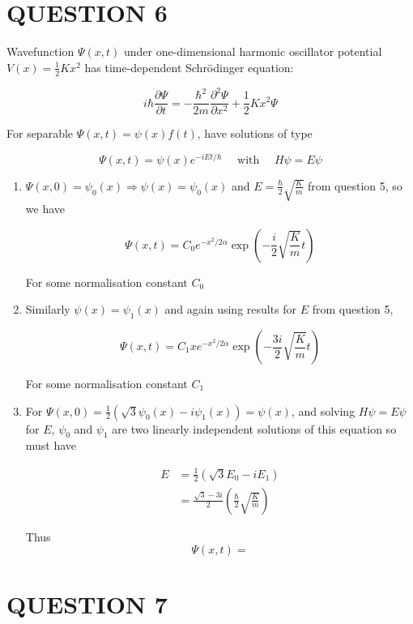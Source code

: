 \documentclass[a4paper]{article}
\begin{document}
\section{QUESTION 6}

Wavefunction $ \Psi(x,t) $ under one-dimensional harmonic oscillator potential $ V(x) = \frac{1}{2}Kx^{2} $ has time-dependent Schr\"odinger equation:

\[ i \hbar \frac{\partial \Psi }{\partial t} = - \frac{\hbar^{2}}{2m} \frac{\partial^{2} \Psi }{\partial x^{2}} + \frac{1}{2}Kx^{2} \Psi \]

For separable $ \Psi(x,t) = \psi(x)f(t) $, have solutions of type

\[ \Psi(x,t) = \psi(x)e^{-iEt/\hbar} \quad \text{ with } \quad H \psi = E \psi \]

\begin{enumerate}
	\item $ \Psi(x,0) = \psi_{0}(x) \Rightarrow \psi(x) = \psi_{0}(x)$ and $ E = \frac{\hbar}{2}\sqrt{\frac{K}{m}} $ from question 5, so we have 
	
	\[ \Psi(x,t) = C_{0} e^{-x^{2}/2\alpha} \exp\left( - \frac{i}{2}\sqrt{\frac{K}{m}} t \right)  \] 
	
	For some normalisation constant $ C_{0} $
	
	\item Similarly $ \psi(x) = \psi_{1}(x) $ and again using results for $ E $ from question 5,
	
	\[ \Psi(x,t) = C_{1} x e^{-x^{2}/2\alpha} \exp\left( - \frac{3i}{2}\sqrt{\frac{K}{m}} t \right)  \] 
	
	For some normalisation constant $ C_{1} $
	
	\item For $ \Psi(x,0)  = \frac{1}{2}  ( \sqrt{3} \psi_{0}(x) - i \psi_{1}(x)) = \psi(x) $, and solving $ H \psi = E \psi $ for $ E $, $ \psi_{0} $ and $ \psi_{1} $ are two linearly independent solutions of this equation so must have
	
	
	\begin{align*}
	E & = \frac{1}{2}(\sqrt{3} E_{0} - i E_{1} )  \\
	& = \frac{\sqrt{3} - 3i}{2} \left( \frac{\hbar}{2} \sqrt{\frac{K}{m}} \right) 
	\end{align*}
	
	Thus \[ \Psi(x,t) =  \]
 	
\end{enumerate}


\section{QUESTION 7}
\end{document}
